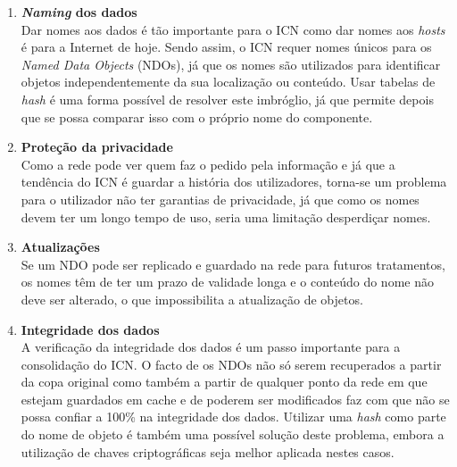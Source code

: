 \documentclass[conference]{IEEEtran}
\begin{document}
\begin{enumerate}


\item \textbf{\textit{Naming} dos dados}\\

Dar nomes aos dados \'{e} t\~{a}o importante para o ICN como dar nomes aos \textit{hosts} \'{e} para a Internet de hoje. Sendo assim, o ICN requer nomes \'{u}nicos para os \textit{Named Data Objects} (NDOs), j\'{a} que os nomes s\~{a}o utilizados para identificar objetos independentemente da sua localiza\c{c}\~{a}o ou conte\'{u}do. Usar tabelas de \textit{hash} \'{e} uma forma poss\'{i}vel de resolver este imbr\'{o}glio, j\'{a} que permite depois que se possa comparar isso com o pr\'{o}prio nome do componente.\\

\item \textbf{Prote\c{c}\~{a}o da privacidade}\\

Como a rede pode ver quem faz o pedido pela informa\c{c}\~{a}o e j\'{a} que a tend\^{e}ncia do ICN \'{e} guardar a hist\'{o}ria dos utilizadores, torna-se um problema para o utilizador n\~{a}o ter garantias de privacidade, j\'{a} que como os nomes devem ter um longo tempo de uso, seria uma limita\c{c}\~{a}o desperdi\c{c}ar nomes.\\

\item \textbf{Atualiza\c{c}\~{o}es}\\

Se um NDO pode ser replicado e guardado na rede para futuros tratamentos, os nomes t\^{e}m de ter um prazo de validade longa e o conte\'{u}do do nome n\~{a}o deve ser alterado, o que impossibilita a atualiza\c{c}\~{a}o de objetos.\\

\item \textbf{Integridade dos dados}\\

A verifica\c{c}\~{a}o da integridade dos dados \'{e} um passo importante para a consolida\c{c}\~{a}o do ICN. O facto de os NDOs n\~{a}o s\'{o} serem recuperados a partir da copa original como tamb\'{e}m a partir de qualquer ponto da rede em que estejam guardados em cache e de poderem ser modificados faz com que n\~{a}o se possa confiar a 100\% na integridade dos dados. Utilizar uma \textit{hash} como parte do nome de objeto \'{e} tamb\'{e}m uma poss\'{i}vel solu\c{c}\~{a}o deste problema, embora a utiliza\c{c}\~{a}o de chaves criptogr\'{a}ficas seja melhor aplicada nestes casos.\\


\end{enumerate}
\end{document}
